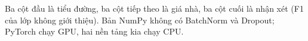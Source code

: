 Ba cột đầu là tiểu đường, ba cột tiếp theo là giá nhà, ba cột cuối là nhận xét (F1 của lớp không giới thiệu). Bản NumPy không có BatchNorm và Dropout; PyTorch chạy GPU, hai nền tảng kia chạy CPU.
